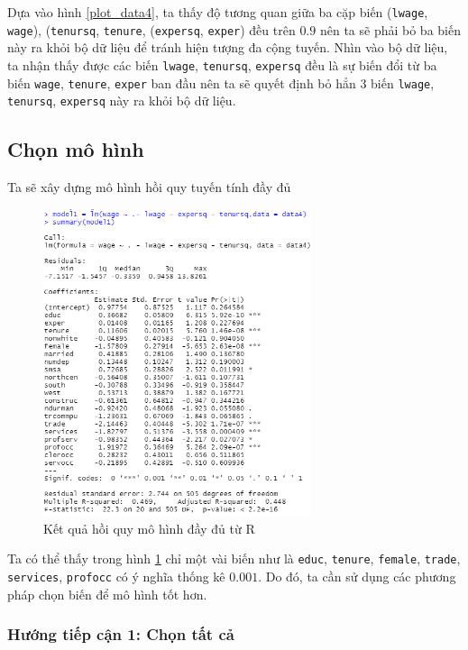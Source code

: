 Dựa vào hình \ref{plot_data4}, ta thấy độ tương quan giữa ba cặp biến (\texttt{lwage}, \texttt{wage}), (\texttt{tenursq}, \texttt{tenure}, (\texttt{expersq}, \texttt{exper}) đều trên $0.9$ nên ta sẽ phải bỏ ba biến này ra khỏi bộ dữ liệu để tránh hiện tượng đa cộng tuyến. Nhìn vào bộ dữ liệu, ta nhận thấy được các biến 
\texttt{lwage}, \texttt{tenursq}, \texttt{expersq} đều là sự biến đổi từ ba biến \texttt{wage}, \texttt{tenure}, \texttt{exper} ban đầu nên ta sẽ quyết định bỏ hẳn 3 biến \texttt{lwage}, \texttt{tenursq}, \texttt{expersq} này ra khỏi bộ dữ liệu.

\subsection*{Chọn mô hình}
Ta sẽ xây dựng mô hình hồi quy tuyến tính đầy đủ

\begin{figure}[H]
	\centering
	\includegraphics[width=0.7\textwidth]{../Photo Of Result/full-model-data4}
	\caption{Kết quả hồi quy mô hình đầy đủ từ R}
	\label{full-model}
\end{figure}

Ta có thể thấy trong hình \ref{full-model} chỉ một vài biến như là \texttt{educ}, \texttt{tenure}, \texttt{female}, \texttt{trade}, \texttt{services}, \texttt{profocc} có ý nghĩa thống kê $0.001$. Do đó, ta cần sử dụng các phương pháp chọn biến để mô hình tốt hơn.
\subsubsection*{Hướng tiếp cận 1: Chọn tất cả}


